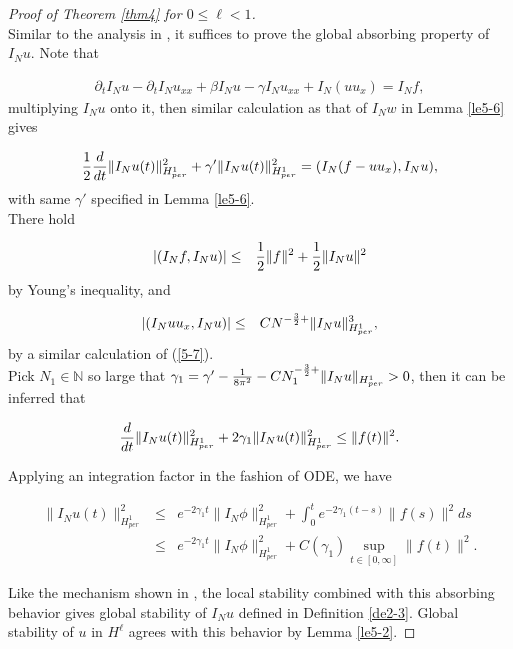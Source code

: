 \documentclass[10pt,a4paper,final]{article}
\numberwithin{equation}{section}
\newcommand{\Gg}{\gamma}
\begin{document}
\begin{proof}[Proof of Theorem \ref{thm4} for $0\le\ell<1$]\ \\
Similar to the analysis in \cite{LW2}, it suffices to prove the global absorbing property of $I_Nu$. Note that

\begin{eqnarray*}
\partial_t I_Nu - \partial_tI_Nu_{xx} + \beta I_Nu  - \gamma I_Nu_{xx} + I_N(uu_x)= I_Nf,
\end{eqnarray*}
multiplying $I_Nu$ onto it, then similar calculation as that of $I_Nw$ in Lemma \ref{le5-6} gives

\begin{eqnarray*}
{1\over 2}{d\over dt}\|I_Nu(t)\|_{H^1_{per}}^2 + \Gg'\|I_Nu(t)\|_{H^1_{per}}^2 = (I_N(f-uu_x), I_Nu),
\end{eqnarray*} with same $\gamma'$ specified in Lemma \ref{le5-6}.\\



There hold

\begin{eqnarray*}
|(I_Nf, I_Nu)|&\le& {1\over 2}\|f\|^2+{1\over 2}\|I_Nu\|^2
\end{eqnarray*} by Young's inequality, and 

\begin{eqnarray*}
|(I_Nuu_x, I_Nu)|&\le& CN^{-{3\over 2}+}\|I_Nu\|^3_{H^1_{per}},
\end{eqnarray*}
by a similar calculation of (\ref{5-7}).\\

Pick $N_1\in\mathbb{N}$ so large that $\gamma_1 = \Gg' -{1\over 8\pi^2} - CN_1^{-{3\over 2}+}\|I_Nu\|_{H^1_{per}}>0$, then it can be inferred that

\begin{eqnarray*}
{d\over dt}\|I_Nu(t)\|_{H^1_{per}}^2+2\gamma_1\|I_Nu(t)\|_{H^1_{per}}^2 \le \|f(t)\|^2.
\end{eqnarray*}

Applying an integration factor in the fashion of ODE, we have

\begin{eqnarray*}
\|I_Nu(t)\|_{H^1_{per}}^2&\le& e^{-{2\gamma_1 t}}\|I_N\phi\|^2_{H^1_{per}}+\int_0^te^{-2\gamma_1{(t-s)}}\|f(s)\|^2ds\\
&\le& e^{-{2\gamma_1 t}}\|I_N\phi\|^2_{H^1_{per}}+{C(\gamma_1)}\sup_{t\in[0, \infty]}\|f(t)\|^2. 
\end{eqnarray*}

Like the mechanism shown in \cite{LW2}, the local stability combined with this absorbing behavior gives global stability of $I_Nu$ defined in Definition \ref{de2-3}. Global stability of $u$ in $H^\ell$ agrees with this behavior by Lemma \ref{le5-2}.
\end{proof}
\end{document}
